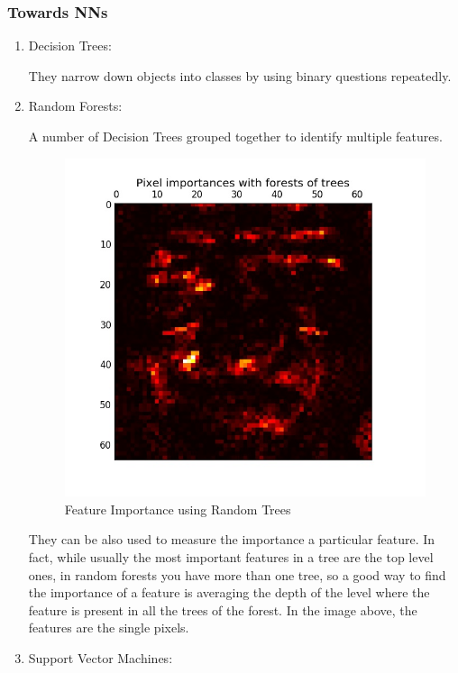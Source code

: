 \subsubsection{Towards NNs}\label{s:fund-intro-tonn}
\begin{enumerate}
	\item Decision Trees:
		
		They narrow down objects into classes by using binary questions repeatedly.
	\item Random Forests:
		
		A number of Decision Trees grouped together to identify multiple features.
		\begin{figure}[H]
			\centering
			\includegraphics[scale=0.4]{images/featureimportance.jpg}
			\caption{Feature Importance using Random Trees}
			\label{f:featureimportance}
		\end{figure}
		They can be also used to measure the importance a particular feature. In fact, while usually the most important features in a tree are the top level ones, in random forests you have more than one tree, so a good way to find the importance of a feature is averaging the depth of the level where the feature is present in all the trees of the forest. In the image above, the features are the single pixels.
	\item Support Vector Machines:
	

\end{enumerate}
